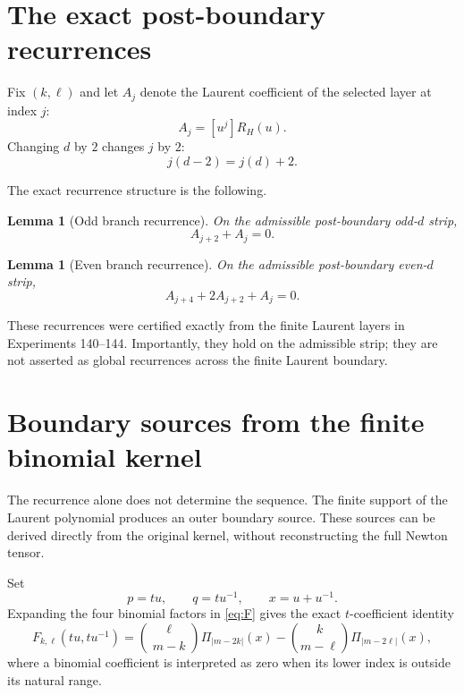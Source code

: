 \documentclass[11pt]{article}
\newtheorem{lemma}[theorem]{Lemma}
\theoremstyle{remark}
\theoremstyle{definition}
\begin{document}
\section{The exact post-boundary recurrences}

Fix $(k,\ell)$ and let $A_j$ denote the Laurent coefficient of the selected
layer at index $j$:
\[
A_j=[u^j]R_H(u).
\]
Changing $d$ by $2$ changes $j$ by $2$:
\begin{equation}
j(d-2)=j(d)+2.
\label{eq:jshift}
\end{equation}

The exact recurrence structure is the following.

\begin{lemma}[Odd branch recurrence]
On the admissible post-boundary odd-$d$ strip,
\begin{equation}
A_{j+2}+A_j=0.
\label{eq:oddrec}
\end{equation}
\end{lemma}

\begin{lemma}[Even branch recurrence]
On the admissible post-boundary even-$d$ strip,
\begin{equation}
A_{j+4}+2A_{j+2}+A_j=0.
\label{eq:evenrec}
\end{equation}
\end{lemma}

These recurrences were certified exactly from the finite Laurent layers in
Experiments 140--144.  Importantly, they hold on the admissible strip; they
are not asserted as global recurrences across the finite Laurent boundary.

\section{Boundary sources from the finite binomial kernel}

The recurrence alone does not determine the sequence.  The finite support of
the Laurent polynomial produces an outer boundary source.  These sources can
be derived directly from the original kernel, without reconstructing the full
Newton tensor.

Set
\begin{equation}
p=tu,\qquad q=tu^{-1},\qquad x=u+u^{-1}.
\label{eq:laurentscale}
\end{equation}
Expanding the four binomial factors in \eqref{eq:F} gives the exact $t$-coefficient
identity
\begin{equation}
[t^m]F_{k,\ell}(tu,tu^{-1})
=\binom{\ell}{m-k}\Pi_{|m-2k|}(x)
-\binom{k}{m-\ell}\Pi_{|m-2\ell|}(x),
\label{eq:Cm}
\end{equation}
where a binomial coefficient is interpreted as zero when its lower index is
outside its natural range.
\end{document}
